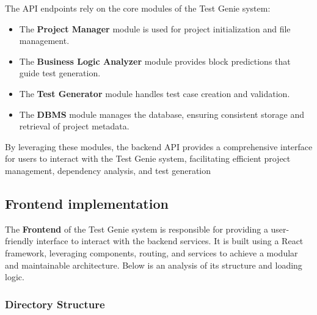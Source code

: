 The API endpoints rely on the core modules of the Test Genie system:
\begin{itemize}
    \item The \textbf{Project Manager} module is used for project initialization and file management.
    \item The \textbf{Business Logic Analyzer} module provides block predictions that guide test generation.
    \item The \textbf{Test Generator} module handles test case creation and validation.
    \item The \textbf{DBMS} module manages the database, ensuring consistent storage and retrieval of project metadata.
\end{itemize}

By leveraging these modules, the backend API provides a comprehensive interface for users to interact with the Test Genie system, facilitating efficient project management, dependency analysis, and test generation

\subsection{Frontend implementation}

The \textbf{Frontend} of the Test Genie system is responsible for providing a user-friendly interface to interact with the backend services. It is built using a React framework, leveraging components, routing, and services to achieve a modular and maintainable architecture. Below is an analysis of its structure and loading logic.

\subsubsection{Directory Structure}

